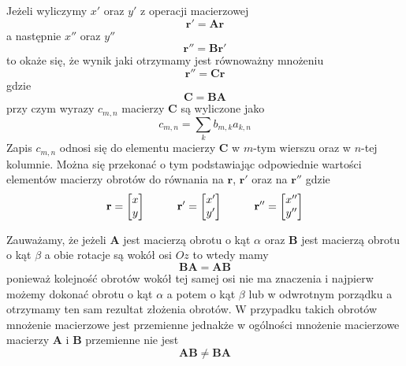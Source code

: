 \documentclass[12pt,a4paper,leqno]{article}
\numberwithin{equation}{section}
\begin{document}
Jeżeli wyliczymy $x'$ oraz $y'$
z operacji macierzowej
\begin{equation}
\mathbf{r}' =    \mathbf{A} \mathbf{r}
\end{equation}
a następnie $x''$ oraz $y''$
\begin{equation}
\mathbf{r}'' =    \mathbf{B} \mathbf{r}'
\end{equation}
to okaże się, że wynik jaki otrzymamy jest równoważny mnożeniu
\begin{equation}
\mathbf{r}'' =    \mathbf{C} \mathbf{r}
\end{equation}
gdzie
\begin{equation}
\mathbf{C} = \mathbf{B} \mathbf{A}
\end{equation}
przy czym wyrazy $c_{m,n}$ macierzy $\mathbf{C}$ są wyliczone jako
\begin{equation}
c_{m,n} = \sum_{k} b_{m,k} a_{k,n}
\end{equation}
Zapis $c_{m,n}$ odnosi się do elementu macierzy $\mathbf{C}$ w $m$-tym wierszu oraz w $n$-tej kolumnie.
Można się przekonać o tym podstawiając odpowiednie wartości elementów macierzy obrotów
do równania na $\mathbf{r}$, $\mathbf{r}'$ oraz na $\mathbf{r}''$ gdzie
\begin{equation}
\mathbf{r} =
\begin{bmatrix}
x \\ 
y 
\end{bmatrix} \hspace{1.0cm}
\mathbf{r}' =
\begin{bmatrix}
x' \\ 
y' 
\end{bmatrix} \hspace{1.0cm}
\mathbf{r}'' =
\begin{bmatrix}
x'' \\ 
y'' 
\end{bmatrix}
\end{equation}

Zauważamy, że jeżeli $\mathbf{A}$ jest macierzą obrotu o kąt $\alpha$
oraz $\mathbf{B}$ jest macierzą obrotu o kąt $\beta$ a obie rotacje są wokół osi $Oz$ to wtedy mamy
\begin{equation}
\mathbf{B} \mathbf{A} = \mathbf{A} \mathbf{B}
\end{equation}
ponieważ kolejność obrotów wokół tej samej osi nie ma znaczenia i najpierw możemy dokonać obrotu o kąt $\alpha$
a potem o kąt $\beta$ lub w odwrotnym porządku a otrzymamy ten sam rezultat złożenia obrotów.
W przypadku takich obrotów mnożenie macierzowe jest przemienne jednakże w ogólności mnożenie macierzowe macierzy 
$\mathbf{A}$ i $\mathbf{B}$
przemienne nie jest
\begin{equation}
\mathbf{A} \mathbf{B} \neq \mathbf{B} \mathbf{A}
\end{equation}
\end{document}
